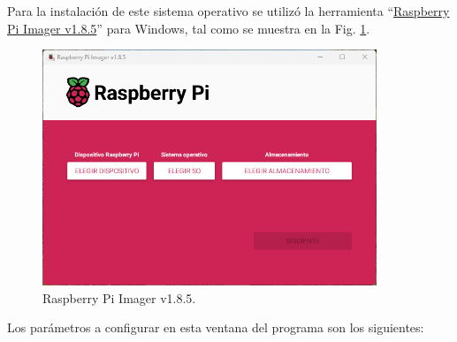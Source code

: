 \documentclass[12pt]{article}
\begin{document}
Para la instalación de este sistema operativo se utilizó la herramienta ``\href{https://www.raspberrypi.com/software/}{Raspberry Pi Imager v1.8.5}'' para Windows, tal como se muestra en la Fig. \ref{RPI_IMAGER}.

\begin{figure}[H]
    \centering
    \includegraphics[width=10cm]{rpi_imager.png}
    \caption{Raspberry Pi Imager v1.8.5.}
    \label{RPI_IMAGER}
\end{figure}

Los parámetros a configurar en esta ventana del programa son los siguientes:
\end{document}
